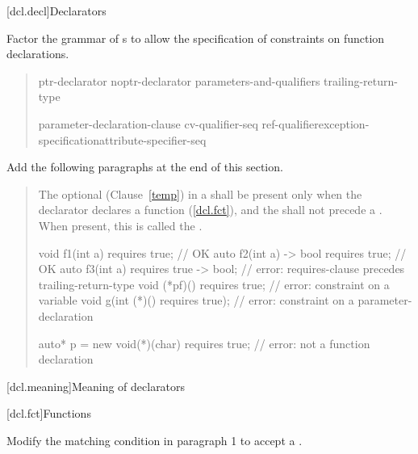 
[dcl.decl]{Declarators}

Factor the grammar of s to
allow the specification of constraints on function declarations.

\begin{quote}
\setcounter{Paras}{3}


\begin{bnf}
\br
    ptr-declarator\br
    noptr-declarator parameters-and-qualifiers trailing-return-type 


\br
  \terminal{(} parameter-declaration-clause \terminal{)} cv-qualifier-seq\opt\br
    \hspace*{\bnfindentinc}ref-qualifier\opt exception-specification\opt attribute-specifier-seq\opt {}\opt
\end{bnf}
\end{quote}


Add the following paragraphs at the end of this section.

\begin{quote}
\pnum
The optional  (Clause~\ref{temp}) in a 
 shall be present only when the declarator declares a 
function (\ref{dcl.fct}), and the  shall not precede a 
. When present, this 
 is called the .

\enterexample
\begin{codeblock}
void f1(int a) requires true;         // OK
auto f2(int a) -> bool requires true; // OK
auto f3(int a) requires true -> bool; // error: requires-clause precedes trailing-return-type
void (*pf)() requires true;           // error: constraint on a variable
void g(int (*)() requires true);      // error: constraint on a parameter-declaration
  
auto* p = new void(*)(char) requires true; // error: not a function declaration
\end{codeblock}
\exitexample
\end{quote}


\setcounter{section}{2}
[dcl.meaning]{Meaning of declarators}


\setcounter{section}{4}
[dcl.fct]{Functions}

Modify the matching condition in paragraph 1 to accept a 
.
      
